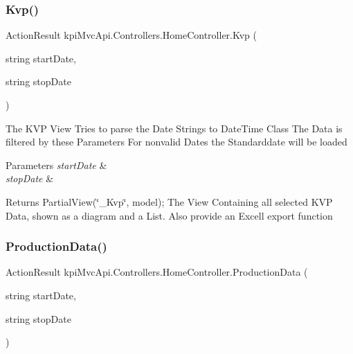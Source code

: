 \subsubsection{\texorpdfstring{Kvp()}{Kvp()}\hspace{0.1cm}{\footnotesize\ttfamily [2/2]}}
{\footnotesize\ttfamily Action\+Result kpi\+Mvc\+Api.\+Controllers.\+Home\+Controller.\+Kvp (\begin{DoxyParamCaption}\item[{string}]{start\+Date,  }\item[{string}]{stop\+Date }\end{DoxyParamCaption})\hspace{0.3cm}{\ttfamily [inline]}}



The K\+VP View Tries to parse the Date Strings to Date\+Time Class The Data is filtered by these Parameters For nonvalid Dates the Standarddate will be loaded 


\begin{DoxyParams}{Parameters}
{\em start\+Date} & \\
\hline
{\em stop\+Date} & \\
\hline
\end{DoxyParams}
\begin{DoxyReturn}{Returns}
{\ttfamily Partial\+View(\char`\"{}\+\_\+\+Kvp\char`\"{}, model);} The View Containing all selected K\+VP Data, shown as a diagram and a List. Also provide an Excell export function 
\end{DoxyReturn}
\mbox{\label{classkpi_mvc_api_1_1_controllers_1_1_home_controller_ae5c2fcc4413eda2cab2775cd9819efca}} 
\subsubsection{\texorpdfstring{Production\+Data()}{ProductionData()}\hspace{0.1cm}{\footnotesize\ttfamily [1/2]}}
{\footnotesize\ttfamily Action\+Result kpi\+Mvc\+Api.\+Controllers.\+Home\+Controller.\+Production\+Data (\begin{DoxyParamCaption}\item[{string}]{start\+Date,  }\item[{string}]{stop\+Date }\end{DoxyParamCaption})\hspace{0.3cm}{\ttfamily [inline]}}



